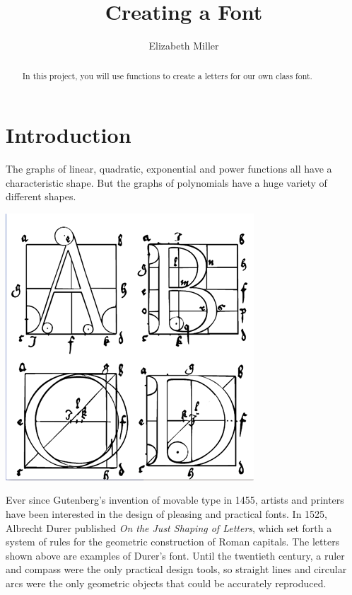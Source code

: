 \documentclass{ximera}
\author{Elizabeth Miller}
\title{Creating a Font}
\begin{document}
\begin{abstract}
  In this project, you will use functions to create a letters for our own class font.  
\end{abstract}
\licenseY
\maketitle




\section{Introduction}

The graphs of linear, quadratic, exponential and power functions all have a characteristic shape. But the graphs of polynomials have a huge variety of different shapes.

\begin{image}
\includegraphics{Durer-font.png}
\end{image}

Ever since Gutenberg's invention of movable type in 1455, artists and printers have been interested in the design of pleasing and practical fonts. In 1525, Albrecht Durer published \textit{On the Just Shaping of Letters}, which set forth a system of rules for the geometric construction of Roman capitals. The letters shown above are examples of Durer's font. Until the twentieth century, a ruler and compass were the only practical design tools, so straight lines and circular arcs were the only geometric objects that could be accurately reproduced.
\end{document}
